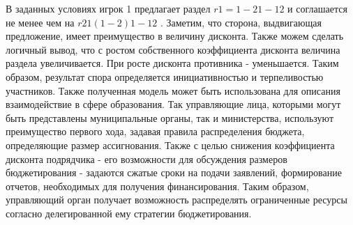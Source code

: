 В заданных условиях игрок 1 предлагает раздел $r1=1-2 1-12$  и соглашается не менее чем на $r2 1(1-2)1-12$ .
Заметим, что сторона, выдвигающая предложение, имеет преимущество в величину дисконта. Также можем сделать логичный вывод, что с ростом собственного коэффициента дисконта величина раздела увеличивается. При росте дисконта противника - уменьшается. Таким образом, результат спора определяется инициативностью и терпеливостью участников.
Также полученная модель может быть использована для описания взаимодействие в сфере образования. Так управляющие лица, которыми могут быть представлены муниципальные органы, так и министерства, используют преимущество первого хода, задавая правила распределения бюджета, определяющие размер ассигнования. Также с целью снижения коэффициента дисконта подрядчика - его возможности для обсуждения размеров бюджетирования - задаются сжатые сроки на подачи заявлений, формирование отчетов, необходимых для получения финансирования. Таким образом, управляющий орган получает возможность распределять ограниченные ресурсы согласно делегированной ему стратегии бюджетирования.  


